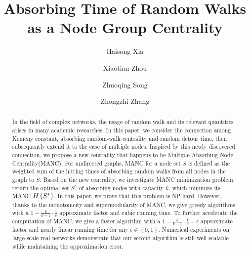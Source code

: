 \documentclass[sigconf]{acmart}
\begin{document}
\sloppy
\fancyhead{}
\title{Absorbing Time of Random Walks as a Node Group Centrality}
\author{Haisong Xia}
\author{Xiaotian Zhou}
\author{Zhuoqing Song}
\author{Zhongzhi Zhang\footnotemark}
\begin{abstract}
    In the field of complex networks, the usage of random walk and its relevant quantities arises in many academic researches.
    In this paper, we consider the connection among Kemeny constant, absorbing random-walk centrality and random detour time, then subsequently extend it to the case of multiple nodes.
    Inspired by this newly discovered connection, we propose a new centrality that happens to be Multiple Absorbing Node Centrality(MANC).
    For undirected graphs, MANC for a node set \(S\) is defined as the weighted sum of the hitting times of absorbing random walks from all nodes in the graph to \(S\).
    Based on the new centrality, we investigate MANC minimization problem: return the optimal set \(S^*\) of absorbing nodes with capacity \(k\), which minimize its MANC \(H\left(S^*\right)\).
    In this paper, we prove that this problem is NP-hard.
    However, thanks to the monotonicity and supermodularity of MANC, we give greedy algorithms with a \(1-\frac{k}{k-1}\cdot\frac{1}{e}\) approximate factor and cubic running time.
    To further accelerate the computation of MANC, we give a faster algorithm with a \(1-\frac{k}{k-1}\cdot\frac{1}{e}-\epsilon\) approximate factor and nearly linear running time for any \(\epsilon\in(0,1)\).
    Numerical experiments on large-scale real networks demonstrate that our second algorithm is still well scalable while maintaining the approximation error.
\end{abstract}
\maketitle
\renewcommand{\thefootnote}{*}
\end{document}
